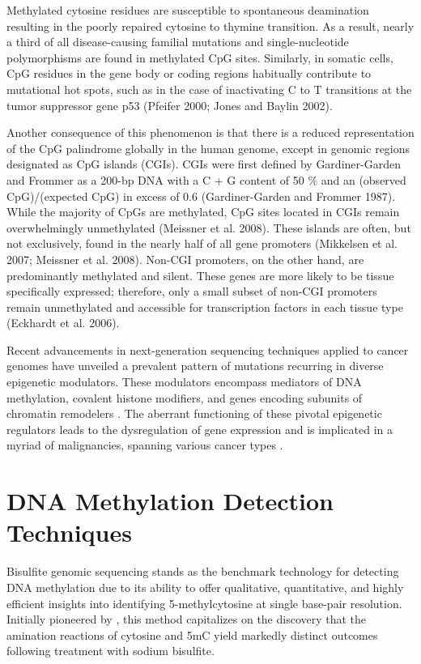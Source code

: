 Methylated cytosine residues are susceptible to spontaneous deamination resulting in the poorly repaired cytosine to thymine transition. As a result, nearly a third of all disease-causing familial mutations and single-nucleotide polymorphisms are found in methylated CpG sites. Similarly, in somatic cells, CpG residues in the gene body or coding regions habitually contribute to mutational hot spots, such as in the case of inactivating C to T transitions at the tumor suppressor gene p53 (Pfeifer 2000; Jones and Baylin 2002).

Another consequence of this phenomenon is that there is a reduced representation of the CpG palindrome globally in the human genome, except in genomic regions designated as CpG islands (CGIs). CGIs were first defined by Gardiner-Garden and Frommer as a 200-bp DNA with a C + G content of 50 \% and an (observed CpG)/(expected CpG) in excess of 0.6 (Gardiner-Garden and Frommer 1987). While the majority of CpGs are methylated, CpG sites located in CGIs remain overwhelmingly unmethylated (Meissner et al. 2008). These islands are often, but not exclusively, found in the nearly half of all gene promoters (Mikkelsen et al. 2007; Meissner et al. 2008). Non-CGI promoters, on the other hand, are predominantly methylated and silent. These genes are more likely to be tissue specifically expressed; therefore, only a small subset of non-CGI promoters remain unmethylated and accessible for transcription factors in each tissue type (Eckhardt et al. 2006).

Recent advancements in next-generation sequencing techniques applied to cancer genomes have unveiled a prevalent pattern of mutations recurring in diverse epigenetic modulators. These modulators encompass mediators of DNA methylation, covalent histone modifiers, and genes encoding subunits of chromatin remodelers \citep{meth_cancer}. The aberrant functioning of these pivotal epigenetic regulators leads to the dysregulation of gene expression and is implicated in a myriad of malignancies, spanning various cancer types \citep{meth_cancer2}.

\section{DNA Methylation Detection Techniques}

Bisulfite genomic sequencing stands as the benchmark technology for detecting DNA methylation due to its ability to offer qualitative, quantitative, and highly efficient insights into identifying 5-methylcytosine at single base-pair resolution. Initially pioneered by \cite{bisulfite_ori}, this method capitalizes on the discovery that the amination reactions of cytosine and \ac{5mC} yield markedly distinct outcomes following treatment with sodium bisulfite.

